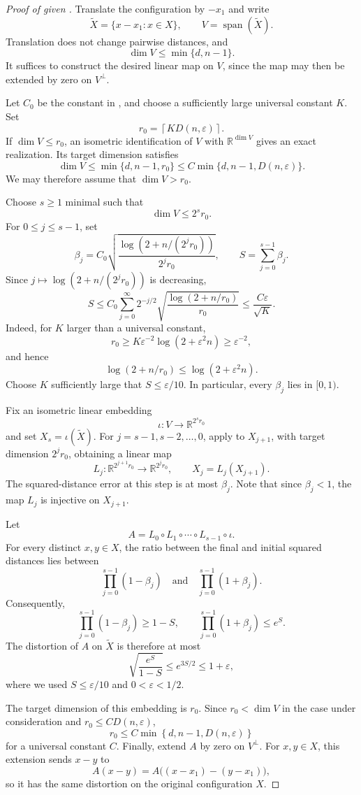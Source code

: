\documentclass[10pt,a4paper]{amsart}
\newcommand{\Dfun}[2]{D(#1,#2)}
\newcommand{\R}{\mathbb R}
\newcommand{\spann}{\operatorname{span}}
\begin{document}
\begin{proof}[Proof of  given ]
Translate the configuration by $-x_1$ and write
\[
 \widetilde X=\{x-x_1:x\in X\},
 \qquad
 V=\spann(\widetilde X).
\]
Translation does not change pairwise distances, and
\[
 \dim V\leq\min\{d,n-1\}.
\]
It suffices to construct the desired linear map on $V$, since the map
may then be extended by zero on $V^\perp$.

Let $C_0$ be the constant in , and choose a
sufficiently large universal constant $K$. Set
\[
 r_0=
 \left\lceil
 K\Dfun{n}{\varepsilon}
 \right\rceil.
\]
If $\dim V\leq r_0$, an isometric identification of $V$ with
$\R^{\dim V}$ gives an exact realization. Its target dimension satisfies
\[
 \dim V\leq\min\{d,n-1,r_0\}
 \leq
 C\min\{d,n-1,\Dfun{n}{\varepsilon}\}.
\]
We may therefore assume that $\dim V>r_0$.

Choose $s\geq1$ minimal such that
\[
 \dim V\leq2^sr_0.
\]
For $0\leq j\leq s-1$, set
\[
 \beta_j
 =
 C_0\sqrt{
 \frac{\log(2+n/(2^jr_0))}{2^jr_0}
 },
 \qquad
 S=\sum_{j=0}^{s-1}\beta_j.
\]
Since $j\mapsto\log(2+n/(2^jr_0))$ is decreasing,
\[
 S
 \leq
 C_0\sum_{j=0}^{\infty}2^{-j/2}
 \sqrt{\frac{\log(2+n/r_0)}{r_0}}
 \leq \frac{C\varepsilon}{\sqrt K}.
\]
Indeed, for $K$ larger than a universal constant,
\[
 r_0
 \geq K\varepsilon^{-2}\log(2+\varepsilon^2n)
 \geq \varepsilon^{-2},
\]
and hence
\[
 \log(2+n/r_0)\leq\log(2+\varepsilon^2n).
\]
Choose $K$ sufficiently large that $S\leq\varepsilon/10$. In
particular, every $\beta_j$ lies in $[0,1)$.

Fix an isometric linear embedding
\[
 \iota:V\longrightarrow\R^{2^sr_0}
\]
and set $X_s=\iota(\widetilde X)$. For
$j=s-1,s-2,\ldots,0$, apply  to $X_{j+1}$, with
target dimension $2^jr_0$, obtaining a linear map
\[
 L_j:\R^{2^{j+1}r_0}\longrightarrow\R^{2^jr_0},
 \qquad
 X_j=L_j(X_{j+1}).
\]
The squared-distance error at this step is at most $\beta_j$. Note that since
$\beta_j<1$, the map $L_j$ is injective on $X_{j+1}$.

Let
\[
 A=L_0\circ L_1\circ\cdots\circ L_{s-1}\circ\iota.
\]
For every distinct $x,y\in X$, the ratio between the final and initial
squared distances lies between
\[
 \prod_{j=0}^{s-1}(1-\beta_j)
 \quad\text{and}\quad
 \prod_{j=0}^{s-1}(1+\beta_j).
\]
Consequently,
\[
 \prod_{j=0}^{s-1}(1-\beta_j)\geq1-S,
 \qquad
 \prod_{j=0}^{s-1}(1+\beta_j)\leq e^S.
\]
The distortion of $A$ on $\widetilde X$ is therefore at most
\[
 \sqrt{\frac{e^S}{1-S}}
 \leq e^{3S/2}
 \leq1+\varepsilon,
\]
where we used $S\leq\varepsilon/10$ and
$0<\varepsilon<1/2$.

The target dimension of this embedding is $r_0$.  Since $r_0<\dim V$ in the case under
consideration and $r_0\leq C\Dfun{n}{\varepsilon}$,
\[
 r_0\leq
 C\min\left\{
 d,n-1,\Dfun{n}{\varepsilon}
 \right\}
\]
for a universal constant $C$.  Finally, extend $A$ by zero on
$V^\perp$.  For $x,y\in X$, this extension sends $x-y$ to
\[
 A(x-y)=A\bigl((x-x_1)-(y-x_1)\bigr),
\]
so it has the same distortion on the original configuration $X$.
\end{proof}
\end{document}
